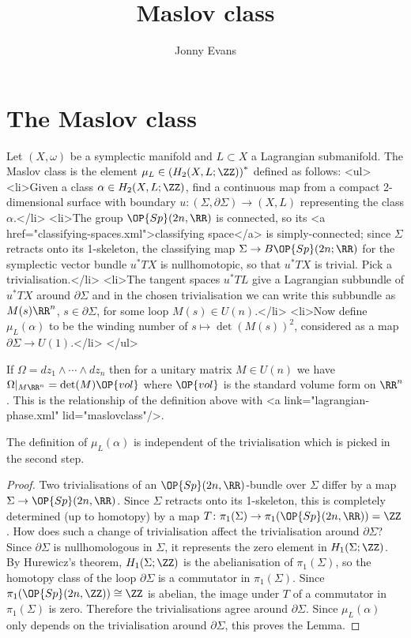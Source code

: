 \documentclass{article}
\title{Maslov class}
\author{Jonny Evans}
\begin{document}
\section{The Maslov class}

\begin{Definition}
  Let $(X,\omega)$ be a symplectic manifold and $L\subset X$ a Lagrangian submanifold. The Maslov class is the element $\mu_L\in\left(H_2(X,L;\ZZ)\right)^*$ defined as follows:
  <ul>
  <li>Given a class $\alpha\in H_2(X,L;\ZZ)$, find a continuous map from a compact 2-dimensional surface with boundary $u\colon(\Sigma,\partial\Sigma)\to (X,L)$ representing the class $\alpha$.</li>
  <li>The group $\OP{Sp}(2n,\RR)$ is connected, so its <a href="classifying-spaces.xml">classifying space</a> is simply-connected; since $\Sigma$ retracts onto its 1-skeleton, the classifying map $\Sigma\to B\OP{Sp}(2n;\RR)$ for the symplectic vector bundle $u^*TX$ is nullhomotopic, so that $u^*TX$ is trivial. Pick a trivialisation.</li>
  <li>The tangent spaces $u^*TL$ give a Lagrangian subbundle of $u^*TX$ around $\partial\Sigma$ and in the chosen trivialisation we can write this subbundle as $M(s)\RR^n$, $s\in\partial\Sigma$, for some loop $M(s)\in U(n)$.</li>
  <li>Now define $\mu_L(\alpha)$ to be the winding number of $s\mapsto\det(M(s))^2$, considered as a map $\partial\Sigma\to U(1)$.</li>
  </ul>
\end{Definition}

\begin{Remark}
  If $\Omega=dz_1\wedge\cdots\wedge dz_n$ then for a unitary matrix $M\in U(n)$ we have $\Omega|_{M\RR^n}=\det(M)\OP{vol}$ where $\OP{vol}$ is the standard volume form on $\RR^n$. This is the relationship of the definition above with <a link="lagrangian-phase.xml" lid="maslovclass"/>.
\end{Remark}

\begin{Lemma}
  The definition of $\mu_L(\alpha)$ is independent of the trivialisation which is picked in the second step.
\end{Lemma}
\begin{proof}
  Two trivialisations of an $\OP{Sp}(2n,\RR)$-bundle over $\Sigma$ differ by a map $\Sigma\to\OP{Sp}(2n,\RR)$. Since $\Sigma$ retracts onto its 1-skeleton, this is completely determined (up to homotopy) by a map $T\colon\pi_1(\Sigma)\to\pi_1(\OP{Sp}(2n,\RR))=\ZZ$. How does such a change of trivialisation affect the trivialisation around $\partial\Sigma$? Since $\partial\Sigma$ is nullhomologous in $\Sigma$, it represents the zero element in $H_1(\Sigma;\ZZ)$. By Hurewicz's theorem, $H_1(\Sigma;\ZZ)$ is the abelianisation of $\pi_1(\Sigma)$, so the homotopy class of the loop $\partial\Sigma$ is a commutator in $\pi_1(\Sigma)$. Since $\pi_1(\OP{Sp}(2n,\ZZ))\cong\ZZ$ is abelian, the image under $T$ of a commutator in $\pi_1(\Sigma)$ is zero. Therefore the trivialisations agree around $\partial\Sigma$. Since $\mu_L(\alpha)$ only depends on the trivialisation around $\partial\Sigma$, this proves the Lemma.
\end{proof}
\end{document}

